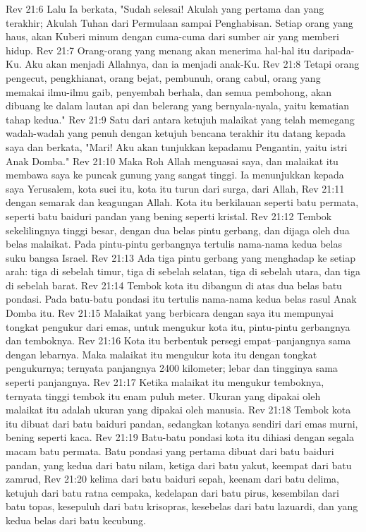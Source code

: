 Rev 21:6  Lalu Ia berkata, "Sudah selesai! Akulah yang pertama dan yang terakhir; Akulah Tuhan dari Permulaan sampai Penghabisan. Setiap orang yang haus, akan Kuberi minum dengan cuma-cuma dari sumber air yang memberi hidup.
Rev 21:7  Orang-orang yang menang akan menerima hal-hal itu daripada-Ku. Aku akan menjadi Allahnya, dan ia menjadi anak-Ku.
Rev 21:8  Tetapi orang pengecut, pengkhianat, orang bejat, pembunuh, orang cabul, orang yang memakai ilmu-ilmu gaib, penyembah berhala, dan semua pembohong, akan dibuang ke dalam lautan api dan belerang yang bernyala-nyala, yaitu kematian tahap kedua."
Rev 21:9  Satu dari antara ketujuh malaikat yang telah memegang wadah-wadah yang penuh dengan ketujuh bencana terakhir itu datang kepada saya dan berkata, "Mari! Aku akan tunjukkan kepadamu Pengantin, yaitu istri Anak Domba."
Rev 21:10  Maka Roh Allah menguasai saya, dan malaikat itu membawa saya ke puncak gunung yang sangat tinggi. Ia menunjukkan kepada saya Yerusalem, kota suci itu, kota itu turun dari surga, dari Allah,
Rev 21:11  dengan semarak dan keagungan Allah. Kota itu berkilauan seperti batu permata, seperti batu baiduri pandan yang bening seperti kristal.
Rev 21:12  Tembok sekelilingnya tinggi besar, dengan dua belas pintu gerbang, dan dijaga oleh dua belas malaikat. Pada pintu-pintu gerbangnya tertulis nama-nama kedua belas suku bangsa Israel.
Rev 21:13  Ada tiga pintu gerbang yang menghadap ke setiap arah: tiga di sebelah timur, tiga di sebelah selatan, tiga di sebelah utara, dan tiga di sebelah barat.
Rev 21:14  Tembok kota itu dibangun di atas dua belas batu pondasi. Pada batu-batu pondasi itu tertulis nama-nama kedua belas rasul Anak Domba itu.
Rev 21:15  Malaikat yang berbicara dengan saya itu mempunyai tongkat pengukur dari emas, untuk mengukur kota itu, pintu-pintu gerbangnya dan temboknya.
Rev 21:16  Kota itu berbentuk persegi empat--panjangnya sama dengan lebarnya. Maka malaikat itu mengukur kota itu dengan tongkat pengukurnya; ternyata panjangnya 2400 kilometer; lebar dan tingginya sama seperti panjangnya.
Rev 21:17  Ketika malaikat itu mengukur temboknya, ternyata tinggi tembok itu enam puluh meter. Ukuran yang dipakai oleh malaikat itu adalah ukuran yang dipakai oleh manusia.
Rev 21:18  Tembok kota itu dibuat dari batu baiduri pandan, sedangkan kotanya sendiri dari emas murni, bening seperti kaca.
Rev 21:19  Batu-batu pondasi kota itu dihiasi dengan segala macam batu permata. Batu pondasi yang pertama dibuat dari batu baiduri pandan, yang kedua dari batu nilam, ketiga dari batu yakut, keempat dari batu zamrud,
Rev 21:20  kelima dari batu baiduri sepah, keenam dari batu delima, ketujuh dari batu ratna cempaka, kedelapan dari batu pirus, kesembilan dari batu topas, kesepuluh dari batu krisopras, kesebelas dari batu lazuardi, dan yang kedua belas dari batu kecubung.
